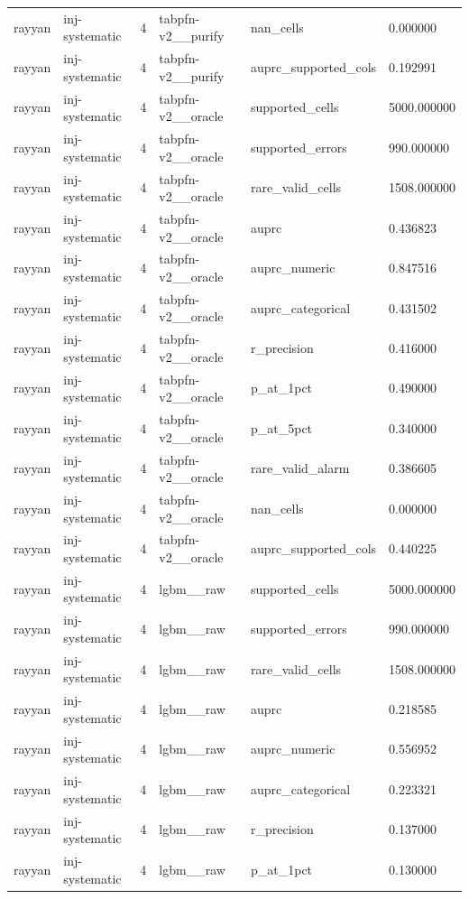 \begin{tabular}{llllll}
rayyan & inj-systematic & 4 & tabpfn-v2\_\_purify & nan\_cells & 0.000000 \\
rayyan & inj-systematic & 4 & tabpfn-v2\_\_purify & auprc\_supported\_cols & 0.192991 \\
rayyan & inj-systematic & 4 & tabpfn-v2\_\_oracle & supported\_cells & 5000.000000 \\
rayyan & inj-systematic & 4 & tabpfn-v2\_\_oracle & supported\_errors & 990.000000 \\
rayyan & inj-systematic & 4 & tabpfn-v2\_\_oracle & rare\_valid\_cells & 1508.000000 \\
rayyan & inj-systematic & 4 & tabpfn-v2\_\_oracle & auprc & 0.436823 \\
rayyan & inj-systematic & 4 & tabpfn-v2\_\_oracle & auprc\_numeric & 0.847516 \\
rayyan & inj-systematic & 4 & tabpfn-v2\_\_oracle & auprc\_categorical & 0.431502 \\
rayyan & inj-systematic & 4 & tabpfn-v2\_\_oracle & r\_precision & 0.416000 \\
rayyan & inj-systematic & 4 & tabpfn-v2\_\_oracle & p\_at\_1pct & 0.490000 \\
rayyan & inj-systematic & 4 & tabpfn-v2\_\_oracle & p\_at\_5pct & 0.340000 \\
rayyan & inj-systematic & 4 & tabpfn-v2\_\_oracle & rare\_valid\_alarm & 0.386605 \\
rayyan & inj-systematic & 4 & tabpfn-v2\_\_oracle & nan\_cells & 0.000000 \\
rayyan & inj-systematic & 4 & tabpfn-v2\_\_oracle & auprc\_supported\_cols & 0.440225 \\
rayyan & inj-systematic & 4 & lgbm\_\_raw & supported\_cells & 5000.000000 \\
rayyan & inj-systematic & 4 & lgbm\_\_raw & supported\_errors & 990.000000 \\
rayyan & inj-systematic & 4 & lgbm\_\_raw & rare\_valid\_cells & 1508.000000 \\
rayyan & inj-systematic & 4 & lgbm\_\_raw & auprc & 0.218585 \\
rayyan & inj-systematic & 4 & lgbm\_\_raw & auprc\_numeric & 0.556952 \\
rayyan & inj-systematic & 4 & lgbm\_\_raw & auprc\_categorical & 0.223321 \\
rayyan & inj-systematic & 4 & lgbm\_\_raw & r\_precision & 0.137000 \\
rayyan & inj-systematic & 4 & lgbm\_\_raw & p\_at\_1pct & 0.130000 \\

\end{tabular}
